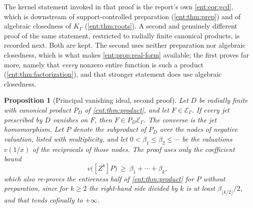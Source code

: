 \documentclass[11pt]{article}
\theoremstyle{plain}
\theoremstyle{plain}
\newtheorem{proposition}[proposition]{Proposition}
\theoremstyle{plain}
\theoremstyle{definition}
\theoremstyle{definition}
\theoremstyle{definition}
\theoremstyle{definition}
\theoremstyle{remark}
\newcommand{\K}{K_\Gamma}\newcommand{\KD}{K_\Delta}
\newcommand{\E}{\mathcal E_\Gamma}
\begin{document}
The kernel statement invoked in that proof is the report's own
\cref{ent:cor:gcd}, which is downstream of support-controlled preparation
(\cref{ent:thm:prep}) and of algebraic closedness of $\K$
(\cref{ent:thm:roots}). A second and genuinely different proof of the same
statement, restricted to radially finite canonical products, is recorded next.
Both are kept. The second uses neither preparation nor algebraic closedness,
which is what makes \cref{ent:prop:real-form} available; the first proves far
more, namely that \emph{every} nonzero entire function is such a product
(\cref{ent:thm:factorization}), and that stronger statement does use
algebraic closedness.

\begin{proposition}[Principal vanishing ideal, second proof]
\label{ent:prop:kernel-direct}
Let $D$ be radially finite with canonical product $P_D$ of
\cref{ent:thm:product}, and let $F\in\E$. If every jet prescribed by $D$
vanishes on $F$, then $F\in P_D\E$. The converse is the jet homomorphism. Let
$P$ denote the subproduct of $P_D$ over the nodes of \emph{negative}
valuation, listed with multiplicity, and let $0<\beta_1\le\beta_2\le\cdots$ be
the valuations $v(1/x)$ of the reciprocals of those nodes. The proof uses only
the coefficient bound
\begin{equation}\label{ent:eq:productcoef}
 v\bigl([Z^k]P\bigr)\ \ge\ \beta_1+\cdots+\beta_k ,
\end{equation}
which also re-proves the entireness half of \cref{ent:thm:product} for $P$
without preparation, since for $k\ge2$ the right-hand side divided by $k$ is
at least $\beta_{\lfloor k/2\rfloor}/2$, and that tends cofinally to $+\infty$.
\end{proposition}
\end{document}
